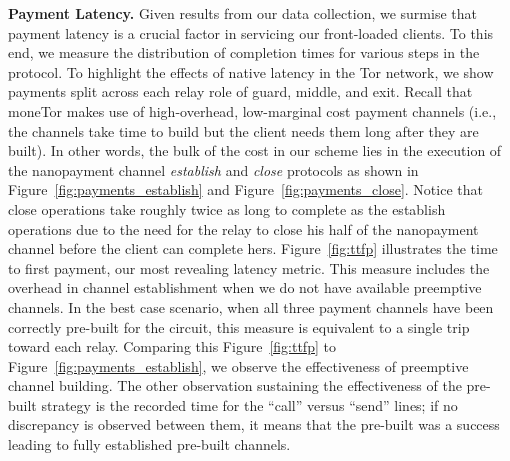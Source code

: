 

\medskip
\noindent
\textbf{Payment Latency.}
Given results from our data collection, we surmise that payment latency is a
crucial factor in servicing our front-loaded clients. To this end, we measure
the distribution of completion times for various steps in the protocol. To
highlight the effects of native latency in the Tor network, we show payments
split across each relay role of guard, middle, and exit. Recall that moneTor
makes use of high-overhead, low-marginal cost payment channels (i.e., the
channels take time to build but the client needs them long after they are
built). In other words, the bulk of the cost in our scheme lies in the
execution of the nanopayment channel \emph{establish} and \emph{close}
protocols as shown in Figure~\ref{fig:payments_establish} and
Figure~\ref{fig:payments_close}. Notice that close operations take roughly twice
as long to complete as the establish operations due to the need for the relay to
close his half of the nanopayment channel before the client can complete hers.
Figure~\ref{fig:ttfp} illustrates the time to first payment, our most revealing
latency metric. This measure includes the overhead in channel establishment when
we do not have available preemptive channels. In the best case scenario, when
all three payment channels have been correctly pre-built for the circuit, this
measure is equivalent to a single trip toward each relay. Comparing this
Figure~\ref{fig:ttfp} to Figure~\ref{fig:payments_establish}, we observe the
effectiveness of preemptive channel building. The other observation sustaining
the effectiveness of the pre-built strategy is the recorded time for the
``call'' versus ``send'' lines; if no discrepancy is observed between them, it means that the pre-built was a success leading to fully established pre-built channels.

